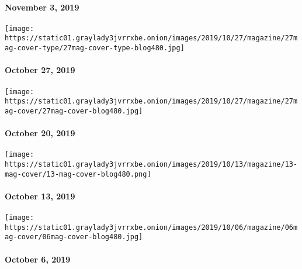 \hypertarget{november-3-2019}{%
\paragraph{November 3, 2019}\label{november-3-2019}}

\href{https://www.nytimes3xbfgragh.onion/issue/magazine/2019/10/25/the-102719-issue}{}

\texttt{[image: https://static01.graylady3jvrrxbe.onion/images/2019/10/27/magazine/27mag-cover-type/27mag-cover-type-blog480.jpg]}

\hypertarget{october-27-2019}{%
\paragraph{October 27, 2019}\label{october-27-2019}}

\href{https://www.nytimes3xbfgragh.onion/issue/magazine/2019/10/18/the-102019-issue}{}

\texttt{[image: https://static01.graylady3jvrrxbe.onion/images/2019/10/27/magazine/27mag-cover/27mag-cover-blog480.jpg]}

\hypertarget{october-20-2019}{%
\paragraph{October 20, 2019}\label{october-20-2019}}

\href{https://www.nytimes3xbfgragh.onion/issue/magazine/2019/10/11/the-101319-issue}{}

\texttt{[image: https://static01.graylady3jvrrxbe.onion/images/2019/10/13/magazine/13-mag-cover/13-mag-cover-blog480.png]}

\hypertarget{october-13-2019}{%
\paragraph{October 13, 2019}\label{october-13-2019}}

\href{https://www.nytimes3xbfgragh.onion/issue/magazine/2019/10/04/the-10619-issue}{}

\texttt{[image: https://static01.graylady3jvrrxbe.onion/images/2019/10/06/magazine/06mag-cover/06mag-cover-blog480.jpg]}

\hypertarget{october-6-2019}{%
\paragraph{October 6, 2019}\label{october-6-2019}}

\href{https://www.nytimes3xbfgragh.onion/interactive/2019/09/24/magazine/adventure-archive-photos.html}{}

